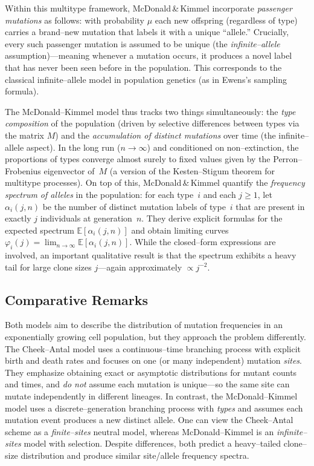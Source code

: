 \documentclass[11pt]{article}
\begin{document}
Within this multitype framework, McDonald\,\&\,Kimmel incorporate \emph{passenger mutations} as follows: with probability $\mu$ each new offspring (regardless of type) carries a brand--new mutation that labels it with a unique ``allele.'' Crucially, every such passenger mutation is assumed to be unique (the \emph{infinite--allele} assumption)—meaning whenever a mutation occurs, it produces a novel label that has never been seen before in the population. This corresponds to the classical infinite--allele model in population genetics (as in Ewens’s sampling formula).

The McDonald--Kimmel model thus tracks two things simultaneously: the \emph{type composition} of the population (driven by selective differences between types via the matrix $M$) and the \emph{accumulation of distinct mutations} over time (the infinite--allele aspect). In the long run ($n\to\infty$) and conditioned on non--extinction, the proportions of types converge almost surely to fixed values given by the Perron--Frobenius eigenvector of~$M$ (a version of the Kesten--Stigum theorem for multitype processes). On top of this, McDonald\,\&\,Kimmel quantify the \emph{frequency spectrum of alleles} in the population: for each type~$i$ and each $j\ge1$, let $\alpha_i(j,n)$ be the number of distinct mutation labels of type~$i$ that are present in exactly $j$ individuals at generation~$n$. They derive explicit formulas for the expected spectrum $\mathbb{E}[\alpha_i(j,n)]$ and obtain limiting curves $\varphi_i(j)=\lim_{n\to\infty}\mathbb{E}[\alpha_i(j,n)]$. While the closed--form expressions are involved, an important qualitative result is that the spectrum exhibits a heavy tail for large clone sizes $j$---again approximately $\propto j^{-2}$.

\subsection{Comparative Remarks}
Both models aim to describe the distribution of mutation frequencies in an exponentially growing cell population, but they approach the problem differently. The Cheek--Antal model uses a continuous--time branching process with explicit birth and death rates and focuses on one (or many independent) mutation \emph{sites}. They emphasize obtaining exact or asymptotic distributions for mutant counts and times, and \emph{do not} assume each mutation is unique—so the same site can mutate independently in different lineages. In contrast, the McDonald--Kimmel model uses a discrete--generation branching process with \emph{types} and assumes each mutation event produces a new distinct allele. One can view the Cheek--Antal scheme as a \emph{finite--sites} neutral model, whereas McDonald--Kimmel is an \emph{infinite--sites} model with selection. Despite differences, both predict a heavy--tailed clone--size distribution and produce similar site/allele frequency spectra.
\end{document}
